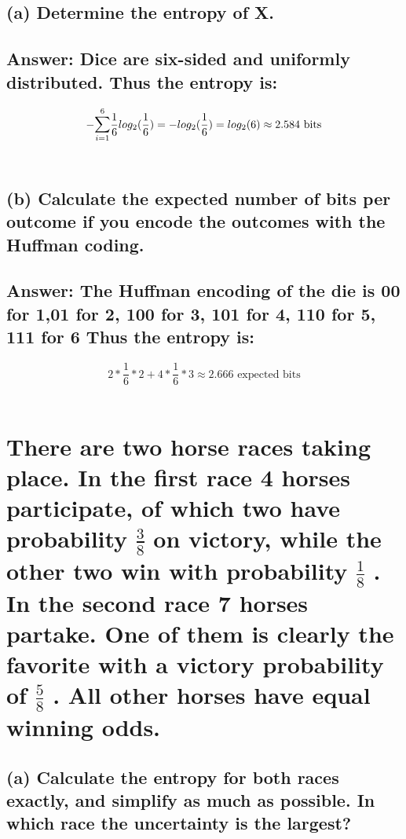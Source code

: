 \documentclass[15px]{article}
\begin{document}
\subsection*{\normalfont (a) Determine the entropy of X.}

\subsection*{ Answer: Dice are six-sided and uniformly distributed. Thus the entropy is:}
\begin{equation}
-\mathlarger{\sum}_{i=1}^{6} \frac{1}{6}log_2(\frac{1}{6}) = -log_2(\frac{1}{6}) = log_2(6) \approx 2.584 \text{ bits}
\end{equation} \\

\subsection*{\normalfont (b) Calculate the expected number of bits per outcome if you encode the outcomes with the Huffman coding.}

\subsection*{Answer: The Huffman encoding of the die is 00 for 1,01 for 2, 100 for 3, 101 for 4, 110 for 5, 111 for 6  Thus the entropy is:}
\begin{equation}
2*\frac{1}{6}*2 + 4*\frac{1}{6}*3 \approx 2.666  \text{ expected bits}
\end{equation} \\

\section{\normalfont There are two horse races taking place. In the first race 4 horses participate, of which two have probability \(\frac{3}{8}\) on victory, while the other two win with probability \(\frac{1}{8}\) . In the second race 7 horses partake. One of them is clearly the favorite with a victory probability of \(\frac{5}{8}\) . All other horses have equal winning odds.}

\subsection*{\normalfont (a) Calculate the entropy for both races exactly, and simplify as much as possible. In which race the uncertainty is the largest?}
\end{document}
